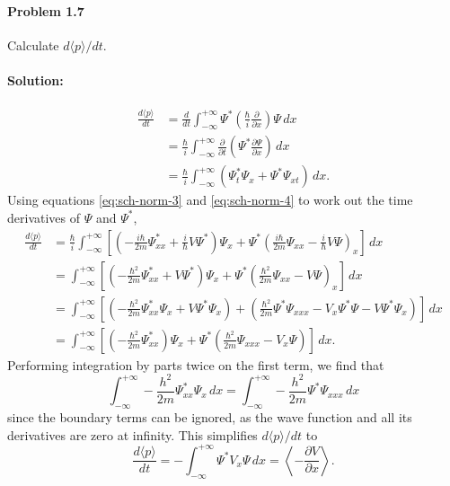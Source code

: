 \documentclass{article}
\begin{document}
\paragraph{Problem 1.7} Calculate $d\langle p \rangle/dt$.

\paragraph{Solution:}
\begin{align*}
  \frac{d\langle p \rangle}{dt}
  &= \frac{d}{dt} \int_{-\infty}^{+\infty} \Psi^* \left(
    \frac{\hbar}{i}\frac{\partial}{\partial x}
  \right) \Psi \,dx \\
  &= \frac{\hbar}{i} \int_{-\infty}^{+\infty} \frac{\partial}{\partial t}\left(
  \Psi^*\frac{\partial \Psi}{\partial x}\right) \,dx \\
  &= \frac{\hbar}{i} \int_{-\infty}^{+\infty} \left(
    \Psi^*_t\Psi_x + \Psi^*\Psi_{xt}
  \right) \,dx.
\end{align*}
Using equations \eqref{eq:sch-norm-3} and \eqref{eq:sch-norm-4} to work out the
time derivatives of $\Psi$ and $\Psi^*$,
\begin{align*}
  \frac{d\langle p \rangle}{dt}
  &= \frac{\hbar}{i} \int_{-\infty}^{+\infty} \left[
    \left(
      -\frac{i\hbar}{2m}\Psi^*_{xx} + \frac{i}{\hbar}V\Psi^*
    \right)\Psi_x + \Psi^*\left(
      \frac{i\hbar}{2m}\Psi_{xx} - \frac{i}{\hbar}V\Psi
    \right)_x
  \right] \,dx \\
  &= \int_{-\infty}^{+\infty} \left[
    \left(
      -\frac{\hbar^2}{2m}\Psi^*_{xx} + V\Psi^*
    \right)\Psi_x + \Psi^*\left(
      \frac{\hbar^2}{2m}\Psi_{xx} - V\Psi
    \right)_x
  \right] \,dx \\
  &= \int_{-\infty}^{+\infty} \left[
    \left(
      -\frac{\hbar^2}{2m}\Psi^*_{xx}\Psi_x + V\Psi^*\Psi_x
    \right) + \left(
      \frac{\hbar^2}{2m}\Psi^*\Psi_{xxx} - V_x\Psi^*\Psi - V\Psi^*\Psi_x
    \right)
  \right] \,dx \\
  &= \int_{-\infty}^{+\infty} \left[
    \left(
      -\frac{\hbar^2}{2m}\Psi^*_{xx}
    \right)\Psi_x + \Psi^*\left(
      \frac{\hbar^2}{2m}\Psi_{xxx} - V_x\Psi
    \right)
  \right] \,dx.
\end{align*}
Performing integration by parts twice on the first term, we find that \[
  \int_{-\infty}^{+\infty}
    -\frac{h^2}{2m}\Psi^*_{xx}\Psi_x
  \,dx
  = \int_{-\infty}^{+\infty}
    -\frac{h^2}{2m}\Psi^*\Psi_{xxx}
  \,dx
\] since the boundary terms can be ignored, as the wave function and all its
derivatives are zero at infinity. This simplifies $d\langle p \rangle/dt$ to \[
  \frac{d\langle p \rangle}{dt} = -\int_{-\infty}^{+\infty} \Psi^* V_x\Psi \,dx
  = \left\langle -\frac{\partial V}{\partial x} \right\rangle.
\]
\end{document}
